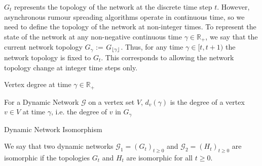 $G_t$ represents the topology of the network at the discrete time step $t$. However, asynchronous rumour spreading algorithms operate in continuous time, so we need to define the topology of the network at non-integer times. To represent the state of the network at any non-negative continuous time $\gamma \in \mathbb{R}_+$, we say that the current network topology $G_\gamma$ := $G_{\lfloor\gamma\rfloor}$. Thus, for any time $\gamma \in [t, t + 1)$ the network topology is fixed to $G_t$. This corresponds to allowing the network topology change at integer time steps only.


\begin{definition}
	Vertex degree at time $\gamma \in \mathbb{R}_+ $ 

	\noindent
	For a Dynamic Network $\mathcal{G}$ on a vertex set $V$, $d_v(\gamma)$ is the degree of a vertex $v \in V$ at time $\gamma$, i.e. the degree of $v$ in $G_\gamma$
\end{definition}

\begin{definition}
	Dynamic Network Isomorphism

	We say that two dynamic networks $\mathcal{G}_1 = (G_t)_{t \geq 0}$ and $\mathcal{G}_2 = (H_t)_{t \geq 0}$ are isomorphic if the topologies $G_t$ and $H_t$ are isomorphic for all $t \geq 0$. 
\end{definition}